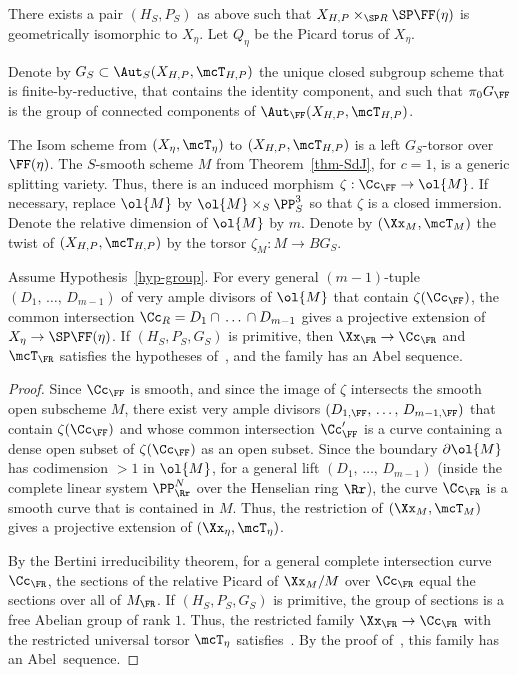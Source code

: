 There exists a pair $(H_S,P_S)$ as above such that $X_{H,P}\times_{\SP R} \SP \FF(\eta)$ is geometrically isomorphic to $X_\eta$. Let $Q_\eta$ be the Picard torus of $X_\eta$.

\begin{nota}\label{notat-group}
Denote by $G_S\subset
\Aut_S(X_{H,P},\mcT_{H,P})$ the unique closed subgroup scheme that is finite-by-reductive, that contains the identity component, and such that $\pi_0 G_{\FF}$ is the group of connected components of $\Aut_{\FF}(X_{H,P},\mcT_{H,P})$.
\end{nota}

The Isom scheme from $(X_\eta,\mcT_\eta)$ to $(X_{H,P},\mcT_{H,P})$ is a left $G_S$-torsor over $\FF(\eta)$. The $S$-smooth scheme $M$ from Theorem~\ref{thm-SdJ}, for $c=1$, is a generic splitting variety. Thus, there is an induced morphism $\zeta:\Cc_{\FF}\to \ol{M}$. If necessary, replace $\ol{M}$ by $\ol{M}\times_S \PP^3_S$ so that $\zeta$ is a closed immersion. Denote the relative dimension of $\ol{M}$ by $m$. Denote by $(\Xx_M,\mcT_M)$ the twist of $(X_{H,P},\mcT_{H,P})$ by the torsor $\zeta_M:M\to BG_S$.

\begin{theo}
\cite{Zhu} \label{thm-group}
Assume Hypothesis~\ref{hyp-group}. For every general $(m-1)$-tuple $(D_1,\,\dots,\,D_{m-1})$ of very ample divisors of $\ol{M}$ that contain $\zeta(\Cc_{\FF})$, the common intersection $\Cc_R = D_1\cap\,\dots\,\cap D_{m-1}$ gives a projective extension of $X_\eta \to \SP \FF(\eta)$. If $(H_S,P_S,G_S)$ is primitive, then $\Xx_\FR \to \Cc_\FR$ and $\mcT_\FR$ satisfies the hypotheses of~\cite[5.1]{Zhu}, and the family has an Abel sequence.
\end{theo}

\begin{proof}
Since $\Cc_{\FF}$ is smooth, and since the image of $\zeta$ intersects the smooth open subscheme $M$, there exist very ample divisors $(D_{1,\FF},\,\dots,\,D_{m-1,\FF})$ that contain $\zeta(\Cc_{\FF})$ and whose common intersection $\Cc'_{\FF}$ is a curve containing a dense open subset of $\zeta(\Cc_{\FF})$ as an open subset. Since the boundary $\partial\ol{M}$ has codimension $>1$ in $\ol{M}$, for a general lift $(D_1,\,\dots,\,D_{m-1})$ (inside the complete linear system $\PP^N_\Rr$ over the Henselian ring $\Rr$), the curve $\Cc_\FR$ is a smooth curve that is contained in $M$. Thus, the restriction of $(\Xx_M,\mcT_M)$ gives a projective extension of $(\Xx_\eta,\mcT_\eta)$.

By the Bertini irreducibility theorem, for a general complete intersection curve $\Cc_\FR$, the sections of the relative Picard of $\Xx_M/M$ over $\Cc_\FR$ equal the sections over all of $M_\FR$. If $(H_S,P_S,G_S)$ is primitive, the group of sections is a free Abelian group of rank $1$. Thus, the restricted family $\Xx_\FR\to \Cc_\FR$ with the restricted universal torsor $\mcT_\eta$ satisfies~\cite[5.1]{Zhu}. By the proof of~\cite[Theorem~1.4]{Zhu}, this family has an Abel~sequence.
\end{proof}


